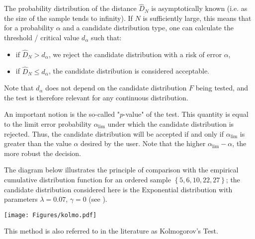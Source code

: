 {  The probability distribution of the distance $\widehat{D}_N$ is asymptotically known (i.e. as the size of the sample tends to infinity). If $N$ is sufficiently large, this means that for a probability $\alpha$ and a candidate distribution type, one can calculate the threshold / critical value $d_\alpha$ such that:
  \begin{itemize}
  \item if  $\widehat{D}_N>d_{\alpha}$, we reject the candidate distribution with a risk of error $\alpha$,
  \item if  $\widehat{D}_N \leq d_{\alpha}$, the candidate distribution is considered acceptable.
  \end{itemize}
  Note that $d_\alpha$ does not depend on the candidate distribution $F$ being tested, and the test is therefore relevant for any continuous distribution.

  An important notion is the so-called "$p$-value" of the test. This quantity is equal to the limit error probability $\alpha_\textrm{lim}$ under which the candidate distribution is rejected. Thus, the candidate distribution will be accepted if and only if $\alpha_\textrm{lim}$ is greater than the value $\alpha$ desired by the user. Note that the higher $\alpha_\textrm{lim} - \alpha$, the more robust the decision.

  The diagram below illustrates the principle of comparison with the empirical cumulative distribution function for an ordered sample $\left\{5,6,10,22,27\right\}$; the candidate distribution considered here is the Exponential distribution with parameters $\lambda = 0.07$, $\gamma = 0$ (see ).

  \begin{center}
    \texttt{[image: Figures/kolmo.pdf]}
  \end{center}
  \vspace{2mm} }
{

  This method is also referred to in the literature as Kolmogorov's Test.
}

